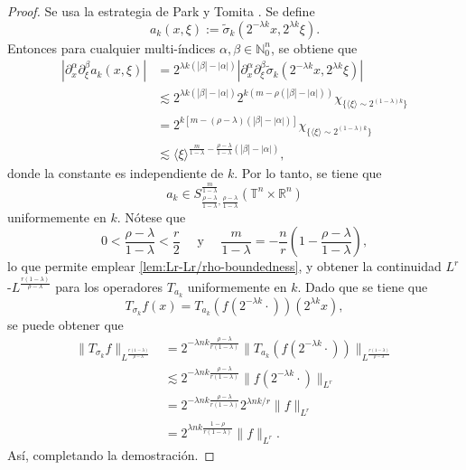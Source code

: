 \begin{proof}
	Se usa la estrategia de Park y Tomita \cite{park-tomita}. Se define    
	\begin{equation*}
		a_k(x, \xi) := \tilde{\sigma}_k(2^{-\lambda k}x, 2^{\lambda k} \xi).
	\end{equation*}
	Entonces para cualquier multi-índices $\alpha, \beta \in \mathbb{N}_0^n$, se obtiene que
	\begin{align*}
		|\partial_x^\alpha\partial_\xi^\beta a_k(x, \xi)| & = 2^{\lambda k(|\beta|-|\alpha|)} |\partial_x^\alpha\partial_\xi^\beta \tilde{\sigma}_k(2^{-\lambda k}x, 2^{\lambda k} \xi)| \\
		& \lesssim 2^{\lambda k(|\beta|-|\alpha|)} 2^{k(m - \rho(|\beta|-|\alpha|))} \chi_{ \{ \langle\xi\rangle \sim 2^{(1-\lambda)k} \} } \\
		& =  2^{ k[m - (\rho-\lambda)(|\beta|-|\alpha|)] } \chi_{ \{ \langle\xi\rangle \sim 2^{(1-\lambda)k} \} } \\
		& \lesssim  \langle\xi\rangle^{ \frac{m}{1-\lambda}  -  \frac{\rho-\lambda}{1-\lambda}(|\beta|-|\alpha|) },
	\end{align*}
	donde la constante es independiente de $k$. Por lo tanto, se tiene que 
	\begin{equation*}
		a_k \in S^{\frac{m}{1-\lambda}}_{ \frac{\rho-\lambda}{1-\lambda} , \frac{\rho-\lambda}{1-\lambda} } (\mathbb{T}^n\times\mathbb{R}^n)
	\end{equation*}
	uniformemente en $k$. Nótese que 
	\begin{equation*}
		0 < \frac{\rho-\lambda}{1-\lambda} < \frac{r}{2} \quad \text{ y } \quad \frac{m}{1-\lambda} = -\frac{n}{r} \left(  1 - \frac{\rho-\lambda}{1-\lambda}
		\right),
	\end{equation*}
	lo que permite emplear \cref{lem:Lr-Lr/rho-boundedness}, y obtener la continuidad $L^r$-$L^\frac{r(1-\lambda)}{\rho-\lambda}$ para los operadores $T_{a_k}$ uniformemente en $k$. Dado que se tiene que 
	\begin{equation*}
		T_{\sigma_k}f(x) = T_{a_k}(f(2^{-\lambda k}\cdot ))(2^{
			\lambda k
		}x),
	\end{equation*}
	se puede obtener que 
	\begin{align*}
		\|T_{\sigma_k}f\|_{L^\frac{r(1-\lambda)}{\rho-\lambda}} &= 2^{ -\lambda nk \frac{\rho-\lambda}{r(1-\lambda)} } \|T_{a_k}(f(2^{-\lambda k} \cdot))\|_{L^\frac{r(1-\lambda)}{\rho-\lambda}} \\
		& \lesssim 2^{ -\lambda nk \frac{\rho-\lambda}{r(1-\lambda)} } \|f(2^{-\lambda k} \cdot)\|_{L^r} \\
		& =  2^{ -\lambda nk \frac{\rho-\lambda}{r(1-\lambda)} } 2^{\lambda nk/r} \|f\|_{L^r} \\
		& =  2^{ \lambda nk \frac{1-\rho}{r(1-\lambda)} } \|f\|_{L^r}.
	\end{align*}
	Así, completando la demostración.
\end{proof}

